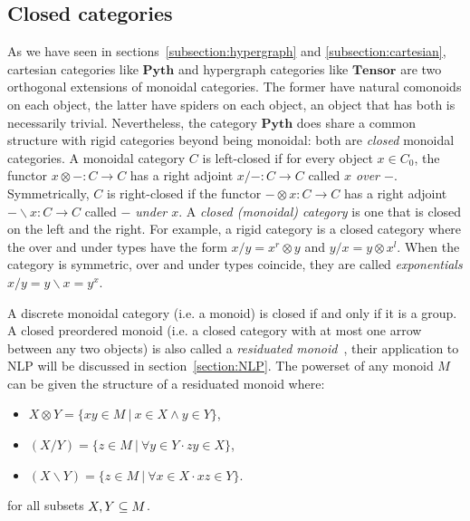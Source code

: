 
\subsection{Closed categories} \label{subsection:closed}

As we have seen in sections~\ref{subsection:hypergraph} and \ref{subsection:cartesian}, cartesian categories like $\mathbf{Pyth}$ and hypergraph categories like $\mathbf{Tensor}$ are two orthogonal extensions of monoidal categories.
The former have natural comonoids on each object, the latter have spiders on each object, an object that has both is necessarily trivial.
Nevertheless, the category $\mathbf{Pyth}$ does share a common structure with rigid categories beyond being monoidal: both are \emph{closed} monoidal categories.
A monoidal category $C$ is left-closed if for every object $x \in C_0$, the functor $x \otimes - : C \to C$ has a right adjoint $x / - : C \to C$ called \emph{$x$ over $-$}.
Symmetrically, $C$ is right-closed if the functor $- \otimes x : C \to C$ has a right adjoint $- \backslash x : C \to C$ called \emph{$-$ under $x$}.
A \emph{closed (monoidal) category} is one that is closed on the left and the right.
For example, a rigid category is a closed category where the over and under types have the form $x / y = x^r \otimes y$ and $y / x = y \otimes x^l$.
When the category is symmetric, over and under types coincide, they are called \emph{exponentials} $x / y = y \backslash x = y^x$.

\begin{example}\label{example:residuated-monoids}
A discrete monoidal category (i.e. a monoid) is closed if and only if it is a group.
A closed preordered monoid (i.e. a closed category with at most one arrow between any two objects) is also called a \emph{residuated monoid}~\cite{Coecke13}, their application to NLP will be discussed in section~\ref{section:NLP}.
The powerset of any monoid $M$ can be given the structure of a residuated monoid where:
\begin{itemize}
    \item $X \otimes Y = \{ x y \in M \ \vert \ x \in X \land y \in Y \}$,
    \item $(X / Y) = \{ z \in M \ \vert \ \forall y \in Y \cdot z y \in X \}$,
    \item $(X \backslash Y) = \{ z \in M \ \vert \ \forall x \in X \cdot x z \in Y \}$.
\end{itemize}
for all subsets $X, Y \subseteq M$.
\end{example}

